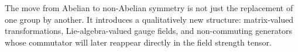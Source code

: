 \documentclass[11pt,a4paper]{article}
\begin{document}

	
	


\begin{takehomebox}
\vspace{0.25cm}
The move from Abelian to non-Abelian symmetry is not just the replacement of one group by another. It introduces a qualitatively new structure: matrix-valued transformations, Lie-algebra-valued gauge fields, and non-commuting generators whose commutator will later reappear directly in the field strength tensor.
\end{takehomebox}
\end{document}
